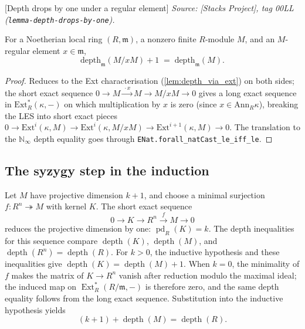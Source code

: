 \begin{lemma}

  [Depth drops by one under a regular element]
  \label{lem:depth_drops_by_one}
  \textit{Source: [Stacks Project], tag 00LL (\texttt{lemma-depth-drops-by-one}).}

  For a Noetherian local ring \((R, \mathfrak m)\), a nonzero finite
  \(R\)-module \(M\), and an \(M\)-regular element \(x \in \mathfrak m\),
  \[
    \text{depth}_{\mathfrak m}(M/xM) + 1 \;=\; \text{depth}_{\mathfrak m}(M).
  \]
\end{lemma}
\begin{proof}

  Reduces to the Ext characterisation
  (\cref{lem:depth_via_ext}) on both sides; the short exact sequence
  \(0 \to M \xrightarrow{\,\cdot x\,} M \to M/xM \to 0\) gives a
  long exact sequence in \(\text{Ext}^*_R(\kappa, -)\) on which
  multiplication by \(x\) is zero (since \(x \in \text{Ann}_R \kappa\)),
  breaking the LES into short exact pieces
  \(0 \to \text{Ext}^i(\kappa, M) \to \text{Ext}^i(\kappa, M/xM) \to
  \text{Ext}^{i+1}(\kappa, M) \to 0\). The translation to the
  \(\mathbb N_\infty\) depth equality goes through
  \texttt{ENat.forall\_natCast\_le\_iff\_le}.
\end{proof}

\subsection{The syzygy step in the induction}
\label{subsec:succ_pd_gap_sequence}

Let \(M\) have projective dimension \(k+1\), and choose a minimal surjection
\(f : R^n \twoheadrightarrow M\) with kernel \(K\). The short exact sequence
\[
  0 \longrightarrow K \longrightarrow R^n \xrightarrow{f} M \longrightarrow 0
\]
reduces the projective dimension by one: \(\operatorname{pd}_R(K)=k\).
The depth inequalities for this sequence compare
\(\operatorname{depth}(K)\), \(\operatorname{depth}(M)\), and
\(\operatorname{depth}(R^n)=\operatorname{depth}(R)\). For \(k>0\), the
inductive hypothesis and these inequalities give
\(\operatorname{depth}(K)=\operatorname{depth}(M)+1\). When \(k=0\), the
minimality of \(f\) makes the matrix of \(K\to R^n\) vanish after reduction
modulo the maximal ideal; the induced map on
\(\operatorname{Ext}^*_R(R/\mathfrak m,-)\) is therefore zero, and the same
depth equality follows from the long exact sequence. Substitution into the
inductive hypothesis yields
\[
  (k+1)+\operatorname{depth}(M)=\operatorname{depth}(R).
\]

